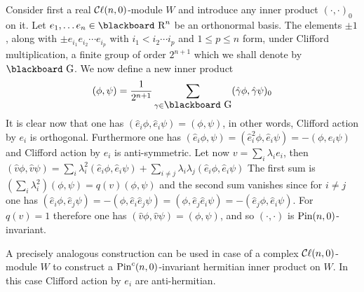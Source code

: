 \documentclass[12pt,titlepage]{article}
\def\bbf#1{\hbox{\blackboard #1}}
\def\lG{\bbf G}
\def\lR{\bbf R}
\def\cC{{\cal C}}
\def\Cl{{\cC\ell}}
\def\Pin{\hbox{Pin}}
\begin{document}
 Consider first a real \(\Cl(n,0)\)-module \(W\) and introduce 
any inner product \((\cdot,\cdot)_0\) on it. Let \(e_1,\dots e_n
\in \lR^n\) be an orthonormal basis. The elements
\(\pm 1\), along with \(\pm e_{i_1}e_{i_2}\cdots e_{i_p}\) 
 with \(i_1 < i_2 \cdots i_p\)  and
\(1\le p \le n\) form, under Clifford multiplication, a finite
group of order \(2^{n+1}\) which we shall denote by \(\lG\).  
We now define a new inner product
\[%
(\phi,\psi) =\frac{1}{2^{n+1}}
\sum_{\gamma\in\lG}(\hat\gamma\phi,\hat\gamma\psi)_0 
\]%
It is clear now that one has \((\hat e_i\phi,\hat e_i\psi)=(\phi,\psi)\), 
in other
words, Clifford action by \(e_i\) is orthogonal. Furthermore one has 
\((\hat e_i\phi,\psi)=(\hat e_i^2\phi,\hat e_i\psi)=
-(\phi,\hat e_i\psi)\) and Clifford 
action by \(e_i\) is anti-symmetric. Let now 
\(v=\sum_i\lambda_ie_i\), then 
\((\hat v\phi,\hat v\psi)=\sum_i\lambda_i^2(\hat e_i\phi,\hat e_i\psi)+ 
\sum_{i \neq 
j}\lambda_i\lambda_j(\hat e_i\phi,\hat e_i\psi)\) The first sum is 
\((\sum_i\lambda_i^2)(\phi,\psi)=q(v)(\phi,\psi)\) and the second sum 
vanishes since for \(i\neq j\) one has \((\hat e_i\phi,\hat e_j\psi)=-
(\phi,\hat e_i\hat e_j\psi)=(\phi,\hat e_j\hat e_i\psi)=
-(\hat e_j\phi,\hat e_i\psi)\). For \(q(v)=1\) 
therefore one has \((\hat v\phi,\hat v\psi)=(\phi,\psi)\),  
and so \((\cdot,\cdot)\)  is 
\(\Pin(n,0)\)-invariant. 

A precisely analogous construction can be used in case of a complex 
\(\Cl(n,0)\)-module 
\(W\) to construct a  \(\Pin^c(n,0)\)-invariant hermitian 
inner product on \(W\). In this case Clifford action by \(e_i\) are
anti-hermitian. 
\end{document}

